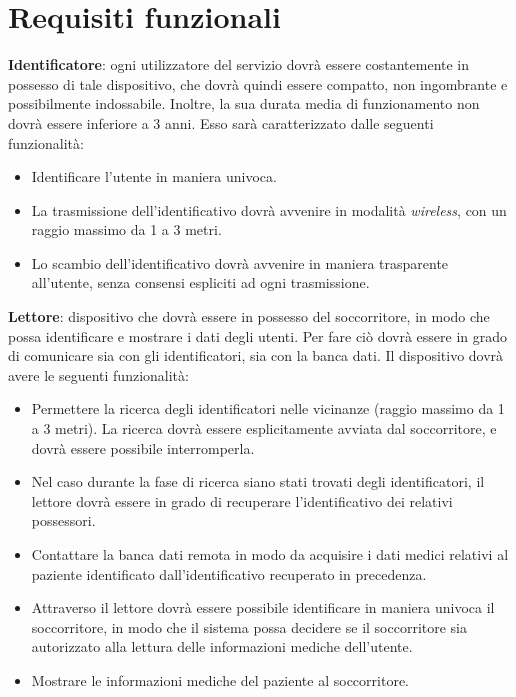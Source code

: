 \documentclass[a4paper,12pt]{report}
\begin{document}
\section{Requisiti funzionali}
\begin{description}
	\item \textbf{Identificatore}: ogni utilizzatore del servizio dovrà essere costantemente in possesso di tale dispositivo, che dovrà quindi essere compatto, non ingombrante e possibilmente indossabile. Inoltre, la sua durata media di funzionamento non dovrà essere inferiore a 3 anni. Esso sarà caratterizzato dalle seguenti funzionalità: 
	\begin{itemize}
		\item Identificare l'utente in maniera univoca.
		\item La trasmissione dell'identificativo dovrà avvenire in modalità \emph{wireless}, con un raggio massimo da 1 a 3 metri.
		\item Lo scambio dell'identificativo dovrà avvenire in maniera trasparente all'utente, senza consensi espliciti ad ogni trasmissione.
	\end{itemize}

	\item \textbf{Lettore}: dispositivo che dovrà essere in possesso del soccorritore, in modo che possa identificare e mostrare i dati degli utenti. Per fare ciò dovrà essere in grado di comunicare sia con gli identificatori, sia con la banca dati. Il dispositivo dovrà avere le seguenti funzionalità:
	\begin{itemize}
		\item Permettere la ricerca degli identificatori nelle vicinanze (raggio massimo da 1 a 3 metri). La ricerca dovrà essere esplicitamente avviata dal soccorritore, e dovrà essere possibile interromperla.
		\item Nel caso durante la fase di ricerca siano stati trovati degli identificatori, il lettore dovrà essere in grado di recuperare l'identificativo dei relativi possessori.
		\item Contattare la banca dati remota in modo da acquisire i dati medici relativi al paziente identificato dall'identificativo recuperato in precedenza.
		\item Attraverso il lettore dovrà essere possibile identificare in maniera univoca il soccorritore, in modo che il sistema possa decidere se il soccorritore sia autorizzato alla lettura delle informazioni mediche dell'utente.
		\item Mostrare le informazioni mediche del paziente al soccorritore.
	\end{itemize}
\end{description}
\end{document}
